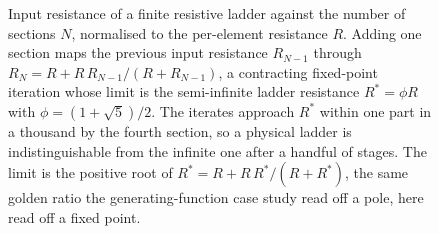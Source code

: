 \begin{figure}[ht]
\centering
{}
\caption[Convergence of the ladder-network input resistance]{Input
resistance of a finite resistive ladder against the number of sections
$N$, normalised to the per-element resistance $R$. Adding one section maps
the previous input resistance $R_{N-1}$ through
$R_{N}=R+R\,R_{N-1}/(R+R_{N-1})$, a contracting fixed-point iteration whose
limit is the semi-infinite ladder resistance $R^{*}=\phi R$ with
$\phi=(1+\sqrt5)/2$. The iterates approach $R^{*}$ within one part in a
thousand by the fourth section, so a physical ladder is indistinguishable
from the infinite one after a handful of stages. The limit is the positive
root of $R^{*}=R+R\,R^{*}/(R+R^{*})$, the same golden ratio the
generating-function case study read off a pole, here read off a fixed
point.}
\label{fig:vol02:ch04:ladder-network}
\end{figure}
